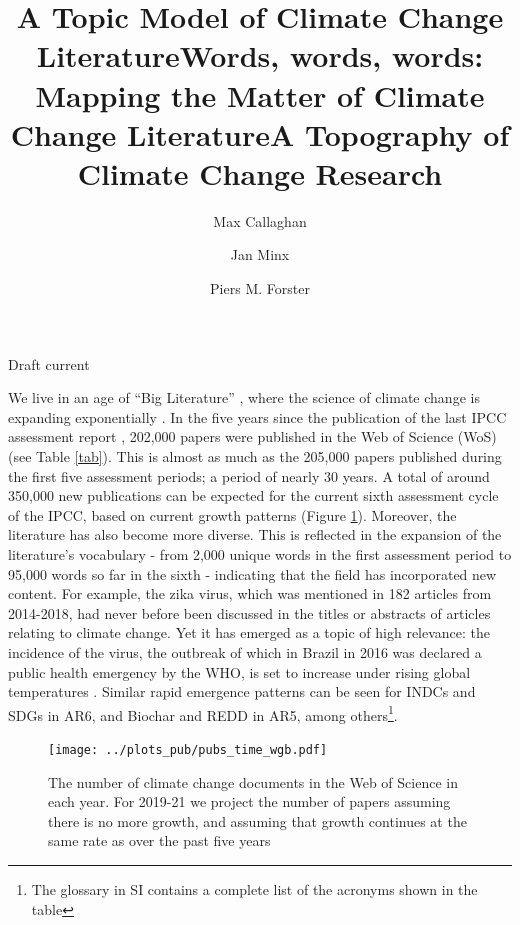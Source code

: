 \documentclass{article}
\title{A Topic Model of Climate Change Literature}
\title{Words, words, words: Mapping the Matter of Climate Change Literature}
\title{A Topography of Climate Change Research}
\author[1,2]{Max Callaghan}
\author[1,2]{Jan Minx}
\author[2]{Piers M. Forster}
\affil[1]{Mercator Research Institute on Global Commons and Climate Change, Torgauer Straße, 10829 Berlin, Germany}
\affil[2]{Priestley International Centre for Climate, University of Leeds, Leeds LS2 9JT, United Kingdom}
\makeatletter
\renewcommand{\maketitle}{\bgroup\setlength{\parindent}{0pt}
	\begin{flushleft}
		
		{\huge\textbf{\@title}}
		
		\bigskip
		
		{\large\textbf{\@author}}
		
		\bigskip
		
		{\large{Draft current \@date}}
		
	\end{flushleft}\egroup
}
\makeatother
\begin{document}
	\maketitle
	
	
	\begin{linenumbers}
		
		\noindent\textbf{}
		
		
		
		\bigskip
		
		\noindent We live in an age of ``Big Literature'' 
		\cite{Nunez-Mir2016, Minx2017l}, where the science of climate change is expanding exponentially \cite{Grieneisen2011, Haunschild2016}. In the five years since the publication of the last IPCC assessment report \cite{IPCC2014c}, 202,000 papers were published in the Web of Science (WoS) (see Table \ref{tab}). This is almost as much as the 205,000 papers published during the first five assessment periods; a period of nearly 30 years. A total of around 350,000 new publications can be expected for the current sixth assessment cycle of the IPCC, based on current growth patterns (Figure \ref{pub-growth}). Moreover, the literature has also become more diverse. This is reflected in the expansion of the literature's vocabulary - from 2,000 unique words in the first assessment period to 95,000 words so far in the sixth - indicating that the field has incorporated new content. For example, the zika virus, which was mentioned in 182 articles from 2014-2018, had never before been discussed in the titles or abstracts of articles relating to climate change. Yet it has emerged as a topic of high relevance: the incidence of the virus, the outbreak of which in Brazil in 2016 was declared a public health emergency by the WHO, is set to increase under rising global temperatures \cite{Rao2019}. Similar rapid emergence patterns can be seen for INDCs and SDGs in AR6, and Biochar and REDD in AR5, among others\footnote{The glossary in SI contains a complete list of the acronyms shown in the table}.
		
		\begin{figure}[htp]
			\begin{center}
				\texttt{[image: ../plots\_pub/pubs\_time\_wgb.pdf]}
				\caption{ The number of climate change documents in the Web of Science in each year. For 2019-21 we project the number of papers assuming there is no more growth, and assuming that growth continues at the same rate as over the past five years}
				\label{pub-growth}
			\end{center}
		\end{figure}
		

\end{linenumbers}
\end{document}
